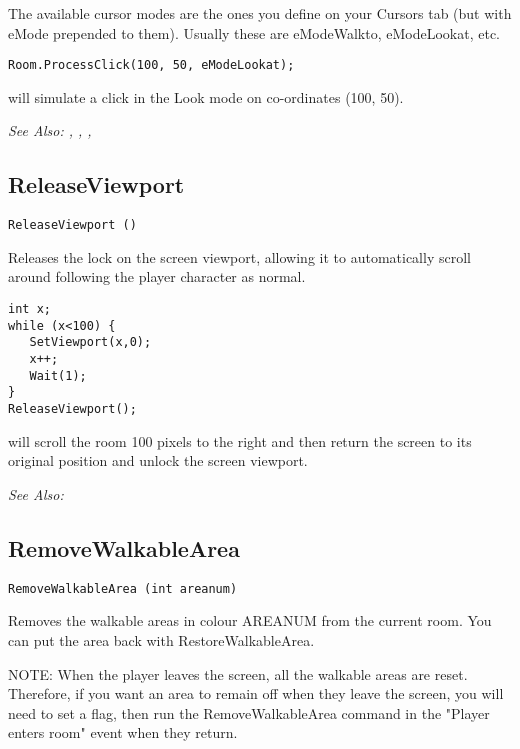 The available cursor modes are the ones you define on your Cursors tab (but with eMode
prepended to them). Usually these are eModeWalkto, eModeLookat, etc.

\begin{verbatim}
Room.ProcessClick(100, 50, eModeLookat);
\end{verbatim}
will simulate a click in the Look mode on co-ordinates (100, 50).

\it{See Also:} ,
,
,


\subsection{ReleaseViewport}\label{ReleaseViewport}%

\begin{verbatim}
ReleaseViewport ()
\end{verbatim}
Releases the lock on the screen viewport, allowing it to automatically
scroll around following the player character as normal.

\begin{verbatim}
int x;
while (x<100) {
   SetViewport(x,0);
   x++;
   Wait(1);
}
ReleaseViewport();
\end{verbatim}
will scroll the room 100 pixels to the right and then return the screen to its original position and unlock the screen viewport.

\it{See Also:} 


\subsection{RemoveWalkableArea}\label{RemoveWalkableArea}%

\begin{verbatim}
RemoveWalkableArea (int areanum)
\end{verbatim}
Removes the walkable areas in colour AREANUM from the current room. You can
put the area back with RestoreWalkableArea.

NOTE: When the player leaves the screen, all the walkable areas are reset.
Therefore, if you want an area to remain off when they leave the screen,
you will need to set a flag, then run the RemoveWalkableArea command in
the "Player enters room" event when they return.

